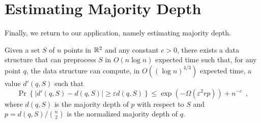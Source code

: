 \documentclass{patmorin}
\newcommand{\eps}{\varepsilon}
\begin{document}
%
%

\section{Estimating Majority Depth}

Finally, we return to our application, namely estimating majority depth. 

\begin{thm}
  Given a set $S$ of $n$ points in $\mathbb{R}^2$ and any constant $c>0$,
  there exists a data structure that can preprocess $S$ in $O(n\log n)$
  expected time such that, for any point $q$, the data structure can
  compute, in $O((\log n)^{4/3})$ expected time, a value $d'(q,S)$
  such that 
  \[
     \Pr\left\{|d'(q,S)-d(q,S)| \ge \eps d(q,S)\right\} 
        \le \exp\left(-\Omega\left(\eps^2rp\right)\right) + n^{-c} \enspace ,
  \]
  where $d(q,S)$ is the majority depth of $p$ with respect to $S$ and
  $p=d(q,S)/\binom{n}{2}$ is the normalized majority depth of $q$.
\end{thm}
\end{document}
